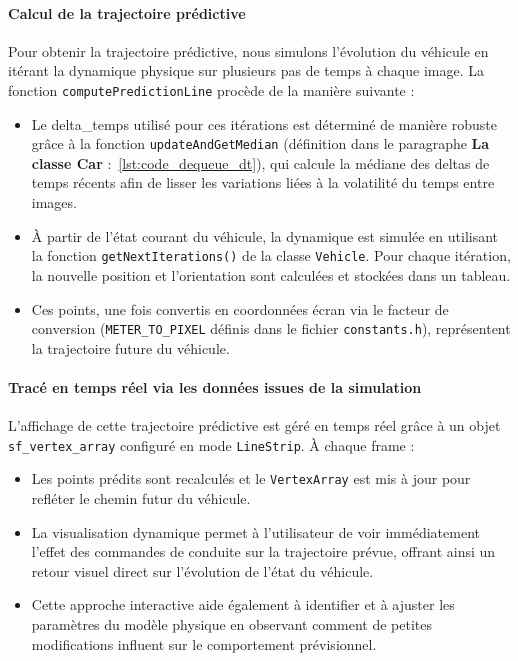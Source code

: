 \paragraph{Calcul de la trajectoire prédictive}
Pour obtenir la trajectoire prédictive, nous simulons l'évolution du véhicule en itérant la dynamique physique sur plusieurs pas de temps à chaque image.
La fonction \texttt{computePredictionLine} procède de la manière suivante :
\begin{itemize}
    \item Le \gls{delta_temps} utilisé pour ces itérations est déterminé de manière robuste grâce à la fonction \texttt{updateAndGetMedian} (définition dans le paragraphe \textbf{La classe Car} :~\ref{lst:code_dequeue_dt}), qui calcule la médiane des deltas de temps récents afin de lisser les variations liées à la volatilité du temps entre images.
    \item À partir de l'état courant du véhicule, la dynamique est simulée en utilisant la fonction \texttt{getNextIterations()} de la classe \texttt{Vehicle}.
    Pour chaque itération, la nouvelle position et l'orientation sont calculées et stockées dans un tableau.
    \item Ces points, une fois convertis en coordonnées écran via le facteur de conversion (\texttt{METER\_TO\_PIXEL} définis dans le fichier \texttt{constants.h}), représentent la trajectoire future du véhicule.
\end{itemize}

\paragraph{Tracé en temps réel via les données issues de la simulation}
L'affichage de cette trajectoire prédictive est géré en temps réel grâce à un objet \texttt{\gls{sf_vertex_array}}\cite{sfml_sf_vertexarray} configuré en mode \texttt{LineStrip}.
À chaque frame :
\begin{itemize}
    \item Les points prédits sont recalculés et le \texttt{VertexArray} est mis à jour pour refléter le chemin futur du véhicule.
    \item La visualisation dynamique permet à l'utilisateur de voir immédiatement l'effet des commandes de conduite sur la trajectoire prévue, offrant ainsi un retour visuel direct sur l'évolution de l'état du véhicule.
    \item Cette approche interactive aide également à identifier et à ajuster les paramètres du modèle physique en observant comment de petites modifications influent sur le comportement prévisionnel.
\end{itemize}

